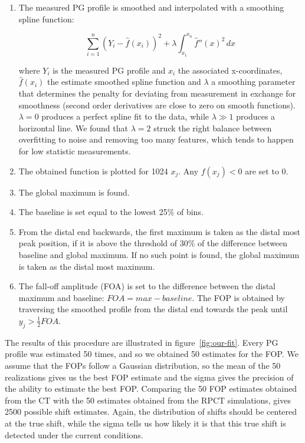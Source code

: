 \documentclass[a4paper,english]{article}
\begin{document}
\begin{enumerate}[noitemsep]
\item The measured PG profile is smoothed and interpolated with a smoothing spline function:

\begin{equation}
\sum_{i=1}^n (Y_i - \hat f(x_i))^2 + \lambda \int_{x_1}^{x_n} \hat f''(x)^2 \,dx
\end{equation}

where $Y_i$ is the measured PG profile and $x_i$ the associated x-coordinates, $\hat f(x_i)$ the estimate smoothed spline function and $\lambda$ a smoothing parameter that determines the penalty for deviating from measurement in exchange for smoothness (second order derivatives are close to zero on smooth functions). $\lambda = 0$ produces a perfect spline fit to the data, while $\lambda \gg 1$ produces a horizontal line. We found that $\lambda = 2$ struck the right balance between overfitting to noise and removing too many features, which tends to happen for low statistic measurements.
\item The obtained function is plotted for 1024 $x_j$. Any $f(x_j) < 0$ are set to $0$. 
\item The global maximum is found.
\item The baseline is set equal to the lowest 25\% of bins.
\item From the distal end backwards, the first maximum is taken as the distal most peak position, if it is above the threshold of 30\% of the difference between baseline and global maximum. If no such point is found, the global maximum is taken as the distal most maximum.
\item The fall-off amplitude (FOA) is set to the difference between the distal maximum and baseline: $FOA = max-baseline$. The FOP is obtained by traversing the smoothed profile from the distal end towards the peak until $y_j > \frac{1}{2}FOA$.
\end{enumerate}

The results of this procedure are illustrated in figure~\ref{fig:our-fit}. Every PG profile was estimated 50 times, and so we obtained 50 estimates for the FOP. We assume that the FOPs follow a Gaussian distribution, so the mean of the 50 realizations gives us the best FOP estimate and the sigma gives the precision of the ability to estimate the best FOP. Comparing the 50 FOP estimates obtained from the CT with the 50 estimates obtained from the RPCT simulations, gives 2500 possible shift estimates. Again, the distribution of shifts should be centered at the true shift, while the sigma tells us how likely it is that this true shift is detected under the current conditions.
\end{document}
